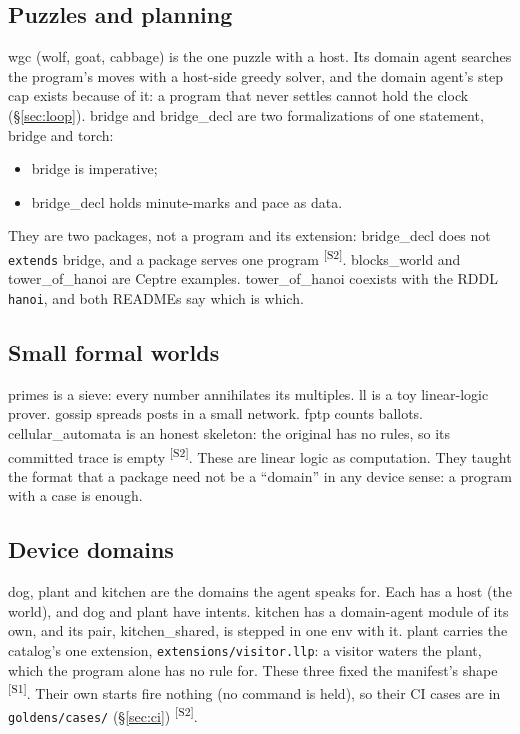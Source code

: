 \documentclass[11pt]{article}
\newcommand{\src}[1]{\textsuperscript{[#1]}}
\begin{document}
\subsection{Puzzles and planning}
wgc (wolf, goat, cabbage) is the one puzzle with a host. Its domain agent
searches the program's moves with a host-side greedy solver, and the
domain agent's step cap exists because of it: a program that never settles
cannot hold the clock (\S\ref{sec:loop}). bridge and bridge\_decl are two
formalizations of one statement, bridge and torch:
\begin{itemize}[nosep]
\item bridge is imperative;
\item bridge\_decl holds minute-marks and pace as data.
\end{itemize}
They are two packages, not a program and its extension: bridge\_decl
does not \texttt{extends} bridge, and a package serves one program
\src{S2}. blocks\_world and tower\_of\_hanoi are Ceptre examples.
tower\_of\_hanoi coexists with the RDDL \texttt{hanoi}, and both READMEs
say which is which.

\subsection{Small formal worlds}
primes is a sieve: every number annihilates its multiples. ll is a toy
linear-logic prover. gossip spreads posts in a small network. fptp counts
ballots. cellular\_automata is an honest skeleton: the original has no
rules, so its committed trace is empty \src{S2}. These are linear logic as
computation. They taught the format that a package need not be a
``domain'' in any device sense: a program with a case is enough.

\subsection{Device domains}
dog, plant and kitchen are the domains the agent speaks for. Each has a
host (the world), and dog and plant have intents. kitchen has a
domain-agent module of its own, and its pair, kitchen\_shared, is stepped
in one env with it. plant carries the catalog's one extension,
\texttt{extensions/visitor.llp}: a visitor waters the plant, which the
program alone has no rule for. These three fixed the manifest's shape
\src{S1}. Their own starts fire nothing (no command is held), so their CI
cases are in \texttt{goldens/cases/} (\S\ref{sec:ci}) \src{S2}.
\end{document}
